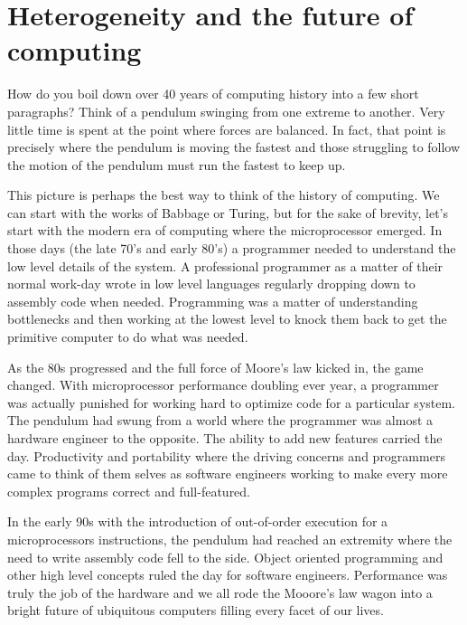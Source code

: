 
\def\ArtDir{01.HeteroComp/figures}%

\chapter{Heterogeneity and the future of computing}
\label{chapter:heterogeneity}

How do you boil down over 40 years of computing history into a few short paragraphs?   
Think of a pendulum swinging from one extreme to another.  Very little time is spent at
the point where forces are balanced.  In fact, that point is precisely where the pendulum is
moving the fastest and those struggling to follow the motion of the pendulum must run the
fastest to keep up.

This picture is perhaps the best way to think of the history of computing.  We can start with the
works of Babbage or Turing, but for the sake of brevity, let's start with the modern era of computing
where the microprocessor emerged.  In those days (the late 70's and early 80's) a programmer
needed to understand the low level details of the system.  A professional programmer as a matter
of their normal work-day wrote in low level languages regularly dropping down to assembly code 
when needed.   Programming was a matter of understanding bottlenecks and then working at the lowest 
level to knock them back to get the primitive computer to do what was needed.

As the 80s progressed and the full force of Moore's law kicked in, the game changed.   With
microprocessor performance doubling ever year, a programmer was actually punished for 
working hard to optimize code for a particular system.  The pendulum had swung from
a world where the programmer was almost a hardware engineer to the opposite.  The ability to 
add new features carried the day.  Productivity and portability where the driving concerns and
programmers came to think of them selves as software engineers working to make every more
complex programs correct and full-featured.

In the early 90s with the introduction of out-of-order execution for a microprocessors instructions, the 
pendulum had reached an extremity where the need to write assembly code fell to the side.  Object oriented
programming and other high level concepts ruled the day for software engineers.  Performance was
truly the job of the hardware and we all rode the Mooore's law wagon into a bright future of
ubiquitous computers filling every facet of our lives.

